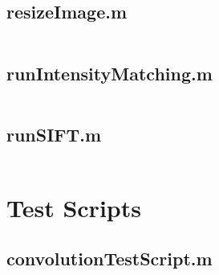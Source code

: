 \documentclass[11pt]{article}
\begin{document}
\begin{appendices}
\subsection*{resizeImage.m}
\label{sec:resizeImage.m}
\inputminted[breaklines=true,breakanywhere=true,fontsize=\small]{matlab}{../src/resizeImage.m}

\subsection*{\hypertarget{runIntensityMatching.m}{runIntensityMatching.m}}
\label{sec:runIntensityMatching.m}
\inputminted[breaklines=true,breakanywhere=true,fontsize=\small]{matlab}{../src/runIntensityMatching.m}

\subsection*{\hypertarget{runSIFT.m}{runSIFT.m}}
\label{sec:runSIFT.m}
\inputminted[breaklines=true,breakanywhere=true,fontsize=\small]{matlab}{../src/runSIFT.m}

{\color{indigo}
\section{Test Scripts}
\label{apdx:test-scripts}}
\subsection*{\hypertarget{convolutionTestScript.m}{convolutionTestScript.m}}
\label{sec:convolutionTestScript.m}
\inputminted[breaklines=true,breakanywhere=true,fontsize=\small]{matlab}{../src/convolutionTestScript.m}

\end{appendices}
\end{document}
